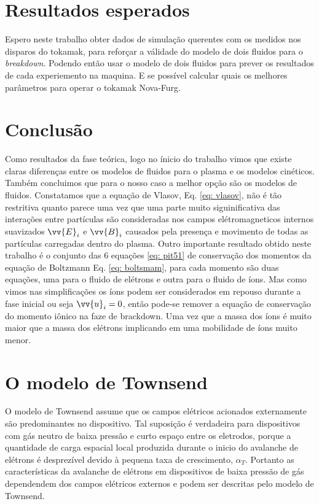 \documentclass[12pt,oneside,a4paper]{abntex2}
\begin{document}
 


\chapter{Resultados esperados}
Espero neste trabalho obter dados de simulação querentes com os medidos nos disparos do tokamak, para reforçar a válidade do modelo de dois fluidos para o \textit{breakdown}. Podendo então usar o modelo de dois fluidos para prever os resultados de cada experiemento na maquina. E se possível calcular quais os melhores parâmetros para operar o tokamak Nova-Furg.

\chapter{Conclusão}
Como resultados da fase teórica, logo no ínicio do trabalho vimos que existe claras diferenças entre os modelos de fluidos para o plasma e os modelos cinéticos. Também concluimos que para o nosso caso a melhor opção são os modelos de fluidos. Constatamos que a equação de Vlasov, Eq. \ref{eq: vlasov}, não é tão restritiva quanto parece uma vez que uma parte muito siguinificativa das interações entre partículas são consideradas nos campos elétromagneticos  internos suavizados $\vv{E}_i$ e $\vv{B}_i$ causados pela presença e movimento de todas as partículas carregadas dentro do plasma. Outro importante resultado obtido neste trabalho é o conjunto das 6 equações \ref{eq: pit51} de conservação dos momentos da equação de Boltzmann Eq. \ref{eq: boltsmam}, para cada momento são duas equações, uma para o fluido de elétrons e outra para o fluido de íons. Mas como vimos nas simplificações os íons podem ser considerados em repouso durante a fase inicial ou seja $\vv{u}_i = 0$, então pode-se remover a equação de conservação do momento iônico na faze de brackdown. Uma vez que a massa dos íons é muito maior que a massa dos elétrons implicando em uma mobilidade de íons muito menor. 
\appendix  
\chapter{O modelo de Townsend}
\label{Townsend}
O modelo de Townsend assume que os campos elétricos acionados externamente são predominantes no dispositivo. Tal suposição é verdadeira para dispositivos com gás neutro de baixa pressão e curto espaço entre os eletrodos, porque a quantidade de carga espacial local produzida durante o inicio do avalanche de elétrons é desprezível devido à pequena taxa de crescimento, $\alpha_T$. Portanto as características da avalanche de elétrons em dispositivos de baixa pressão de gás dependendem dos campos elétricos externos e podem ser descritas pelo modelo de Townsend. 
\end{document}
